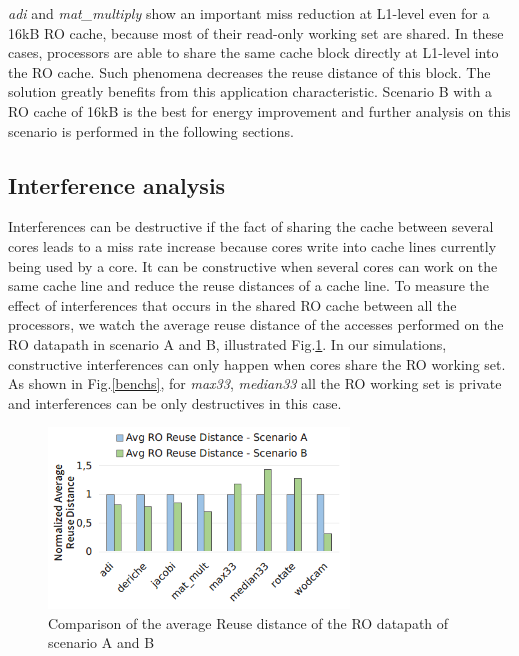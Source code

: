 \documentclass[sigconf]{acmart}
\begin{document}
\textit{adi} and \textit{mat\_multiply} show an
important miss reduction at L1-level even for a 16kB RO cache, because
most of their read-only working set are shared. In these cases,
processors are able to share the same cache block directly at L1-level
into the RO cache. Such phenomena decreases the reuse distance of this
block. The solution greatly benefits from this
application characteristic. Scenario B with a RO cache of 16kB is
the best for energy improvement and further analysis on this scenario
is performed in the following sections.



\subsection{Interference analysis}

Interferences can be destructive if the fact of sharing the cache between several cores leads to a miss rate increase because cores write into cache lines currently being used by a core. It can be constructive when several cores can work on the same cache line and reduce the reuse distances of a cache line. To measure the effect of interferences that occurs in the shared RO cache between all the processors, we watch the average reuse distance of the accesses performed on the RO datapath in scenario A and B, illustrated Fig.\ref{interference}. In our simulations, constructive interferences can only happen when cores share the RO working set. As shown in Fig.\ref{benchs}, for  \textit{max33}, \textit{median33} all the RO working set is private and interferences can be only destructives in this case. 

\begin{figure}
    \centering
    \includegraphics[width=8cm]{./images/interference.png}
    \caption{Comparison of the average Reuse distance of the RO datapath of scenario A and B}
    \label{interference}
\end{figure}
\end{document}
